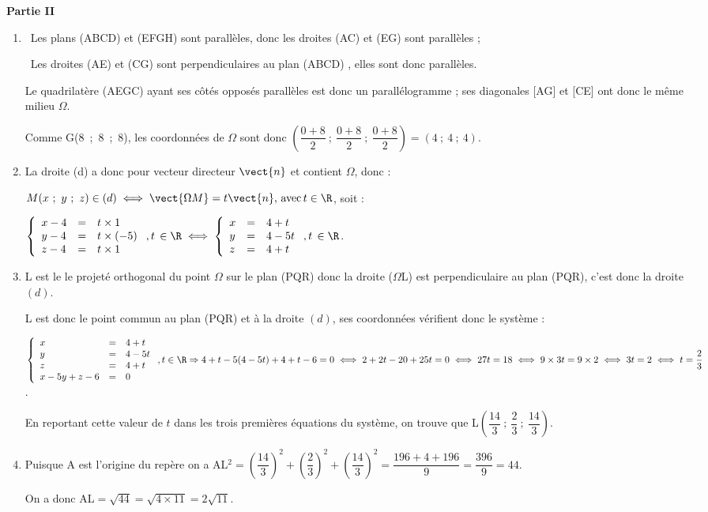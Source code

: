 \textbf{Partie II}

\medskip





\begin{enumerate}
\item 
\starredbullet~Les plans (ABCD) et (EFGH) sont parallèles, donc les droites (AC) et (EG) sont parallèles ;

\starredbullet~Les droites (AE) et (CG) sont perpendiculaires au plan (ABCD) , elles sont donc  parallèles.

Le quadrilatère (AEGC) ayant ses côtés opposés parallèles est donc un parallélogramme  ; ses diagonales [AG] et [CE] ont donc le même milieu $\Omega$.

Comme G(8~;~8~;~8), les coordonnées de $\Omega$ sont donc $\left(\dfrac{0 + 8}{2}~;~\dfrac{0 + 8}{2}~;~\dfrac{0 + 8}{2}\right) = (4~;~4~;~4)$.
\item 
La droite (d) a donc pour vecteur directeur $\vect{n}$ et contient $\Omega$, donc :

$M(x~;~y~;~z) \in (d) \iff \vect{\Omega M} = t\vect{n}, \, \text{avec}\, t \in \R$, soit :

$\left\{\begin{array}{l c l}
x - 4&=&t \times 1\\
y - 4&=&t \times (- 5)\\
z - 4&=&t \times 1
\end{array}\right., t\, \in \R \iff \left\{\begin{array}{l c l}
x &=&4 + t\\
y &=&4 - 5t\\
z &=&4 + t
\end{array}\right., t \, \in \R $.
\item 
L est le le projeté orthogonal du point $\Omega$ sur le plan (PQR) donc la droite ($\Omega$L) est perpendiculaire au plan (PQR), c'est donc la droite $(d)$.

L est donc le point commun au plan (PQR) et à la droite $(d)$, ses coordonnées vérifient donc le système :

$\left\{\begin{array}{l c l}
x &=&4 + t\\
y &=&4 - 5t\\
z &=&4 + t\\
 x - 5y + z  - 6 &=& 0
\end{array}\right., t \in \R \Rightarrow 4 + t  - 5(4 - 5t) + 4 + t - 6 = 0 \iff 2 + 2t - 20 + 25t = 0 \iff 27t = 18 \iff 9 \times 3t = 9 \times 2 \iff 3t = 2 \iff t = \dfrac{2}{3}$.

En reportant cette valeur de $t$ dans les trois premières équations du système, on trouve que L$\left(\dfrac{14}{3}~;~ \dfrac{2}{3}~;~\dfrac{14}{3}\right)$.
\item 
Puisque A est l'origine du repère on a AL$^2 = \left(\dfrac{14}{3}\right)^2 + \left(\dfrac{2}{3}\right)^2 + \left(\dfrac{14}{3}\right)^2 =  \dfrac{196 + 4 + 196}{9} = \dfrac{396}{9} = 44$.

On a donc AL$ = \sqrt{44} = \sqrt{4 \times 11} = 2\sqrt{11}$.
\end{enumerate}


\bigskip
